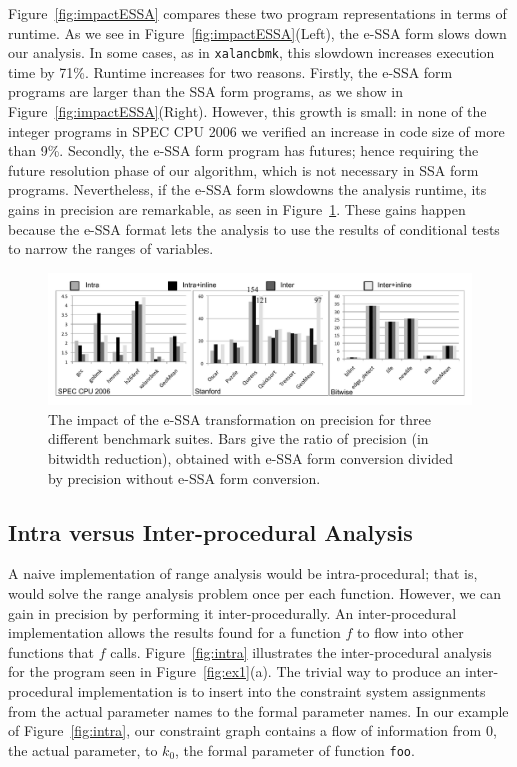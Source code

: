 \documentclass[preprint]{elsarticle}
\begin{document}
Figure~\ref{fig:impactESSA} compares these two program representations in
terms of runtime.
As we see in Figure~\ref{fig:impactESSA}(Left), the e-SSA form slows down our
analysis.
In some cases, as in \texttt{xalancbmk}, this slowdown increases execution
time by 71\%.
Runtime increases for two reasons.
Firstly, the e-SSA form programs are larger than the SSA form programs, as we
show in Figure~\ref{fig:impactESSA}(Right).
However, this growth is small: in none of the integer programs in SPEC
CPU 2006 we verified an increase in code size of more than 9\%.
Secondly, the e-SSA form program has futures; hence requiring the future
resolution phase of our algorithm, which is not necessary in SSA form programs.
Nevertheless, if the e-SSA form slowdowns the analysis runtime, its gains in precision
are remarkable, as seen in Figure~\ref{fig:precESSA}.
These gains happen because the e-SSA format lets the analysis to use the
results of conditional tests to narrow the ranges of variables.

\begin{figure}[t!]
\begin{center}
\includegraphics[width=1\textwidth]{images/precESSA}
\end{center}
\caption{\label{fig:precESSA}
The impact of the e-SSA transformation on precision for three different
benchmark suites. Bars give the ratio of precision (in bitwidth reduction),
obtained with e-SSA form conversion divided by precision without e-SSA form
conversion.}
\end{figure}

\subsection{Intra versus Inter-procedural Analysis}
\label{sub:whole}

A naive implementation of range analysis would be intra-procedural; that is,
would solve the range analysis problem once per each function.
However, we can gain in precision by performing it inter-procedurally.
An inter-procedural implementation allows the results found for a function $f$
to flow into other functions that $f$ calls.
Figure~\ref{fig:intra} illustrates the inter-procedural analysis for the
program seen in Figure~\ref{fig:ex1}(a).
The trivial way to produce an inter-procedural implementation is to insert
into the constraint system assignments from the actual parameter names to the
formal parameter names.
In our example of Figure~\ref{fig:intra}, our constraint graph contains a flow
of information from $0$, the actual parameter, to $k_0$, the formal parameter
of function \texttt{foo}.
\end{document}
